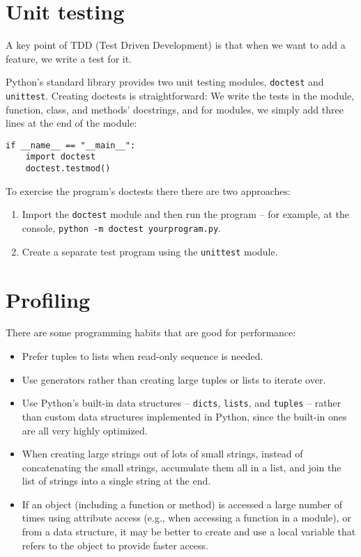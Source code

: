 \section{Unit testing}

A key point of TDD (Test Driven Development) is that when we want to add a feature, we  write a test for it.


Python's standard library provides two unit testing modules, \verb|doctest| and \verb|unittest|.
Creating doctests is straightforward:
We write the tests in the module, function, class, and methods’ docstrings, and for modules, we simply add three lines at the end of the module:
\begin{lstlisting}
if __name__ == "__main__":
    import doctest
    doctest.testmod()
\end{lstlisting}

To exercise the program's doctests there there are two approaches:
\begin{enumerate}
\item Import the \verb|doctest| module and then run the program -- for example, at the console, \verb|python -m doctest yourprogram.py|.
\item Create a separate test program using the \verb|unittest| module.
\end{enumerate}




\section{Profiling}

There are some programming habits that are good for performance:
\begin{itemize}
\item Prefer tuples to lists when read-only sequence is needed.
\item Use generators rather than creating large tuples or lists to iterate over.
\item Use Python’s built-in data structures -- \verb|dicts|, \verb|lists|, and \verb|tuples| -- rather than custom data structures implemented in Python, since the built-in ones are all very highly optimized.
\item When creating large strings out of lots of small strings, instead of concatenating the small strings, accumulate them all in a list, and join the list of strings into a single string at the end.
\item If an object (including a function or method) is accessed a large number of times using attribute access (e.g., when accessing a function in a module), or from a data structure, it may be better to create and use a local variable that refers to the object to provide faster access.
\end{itemize}




